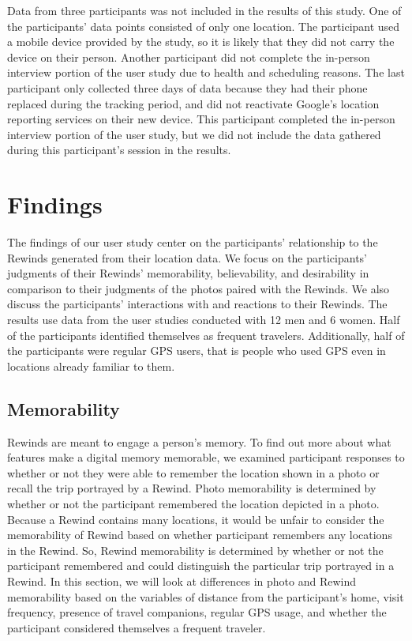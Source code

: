 \documentclass{sigchi}
\begin{document}
Data from three participants was not included in the results of this study. One of the participants' data points consisted of only one location. The participant used a mobile device provided by the study, so it is likely that they did not carry the device on their person. Another participant did not complete the in-person interview portion of the user study due to health and scheduling reasons. The last participant only collected three days of data because they had their phone replaced during the tracking period, and did not reactivate Google's location reporting services on their new device. This participant completed the in-person interview portion of the user study, but we did not include the data gathered during this participant's session in the results.

\section{Findings}
The findings of our user study center on the participants' relationship to the Rewinds generated from their location data. We focus on the participants' judgments of their Rewinds' memorability, believability, and desirability in comparison to their judgments of the photos paired with the Rewinds. We also discuss the participants' interactions with and reactions to their Rewinds. The results use data from the user studies conducted with 12 men and 6 women. Half of the participants identified themselves as frequent travelers. Additionally, half of the participants were regular GPS users, that is people who used GPS even in locations already familiar to them.

\subsection{Memorability}
Rewinds are meant to engage a person's memory. To find out more about what features make a digital memory memorable, we examined participant responses to whether or not they were able to remember the location shown in a photo or recall the trip portrayed by a Rewind. Photo memorability is determined by whether or not the participant remembered the location depicted in a photo. Because a Rewind contains many locations, it would be unfair to consider the memorability of Rewind based on whether participant remembers any locations in the Rewind. So, Rewind memorability is determined by whether or not the participant remembered and could distinguish the particular trip portrayed in a Rewind. In this section, we will look at differences in photo and Rewind memorability based on the variables of distance from the participant's home, visit frequency, presence of travel companions, regular GPS usage, and whether the participant considered themselves a frequent traveler.
\end{document}
